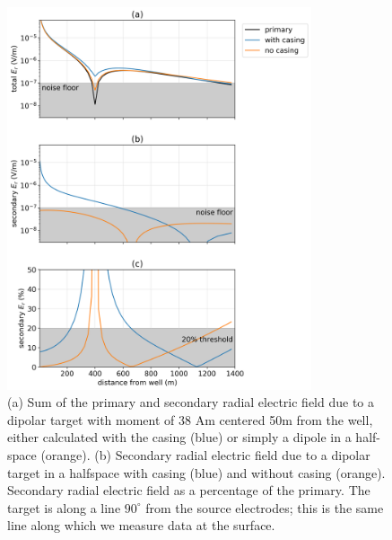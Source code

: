 \begin{figure}
    \begin{center}
    \includegraphics[width=0.8\textwidth]{figures/detectability_dipole.png}
    \end{center}
\caption{
    (a) Sum of the primary and secondary radial electric field due to a dipolar
    target with moment of 38 Am
    centered 50m from the well, either calculated with the
    casing (blue) or simply a dipole in a half-space (orange). (b) Secondary
    radial electric field due to a dipolar target in a halfspace with casing (blue) and without casing (orange).
    Secondary radial electric field as a percentage of the primary.
    The target is along a line $90^\circ$ from the
    source electrodes; this is the same line along which we measure data at the surface.
}
\label{fig:detectability_dipole}
\end{figure}
